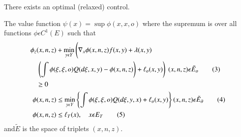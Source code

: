 \medskip
{}

\begin{thm}%
  There exists an optimal (relaxed) control.
\end{thm}

\begin{thm}%
  The value function $\psi (x)= \sup \phi (x, x, o)$ where the
  supremum is over all functions $\phi \epsilon C^1(E)$ such that 
  \begin{align*}
    \phi_z &(x, n, z)  + \min_{y \epsilon Y}
    \left(\vphantom{\int}\nabla_x \phi (x, n, z) 
    f(x, y) + \lambda(x, y)\right.\\ 
     & \left. \left(\int \phi ( \xi, \xi, o) Q (d \xi, x, y)
    - \phi (x, n, z)\right) + \ell_o (x, y) \right) ~(x, n, z) \epsilon
    \tilde{E}_o \tag{3}\label{chap2:eq3}\\
    & \geq 0\\
    \phi & (x, n, z) \leq \min_{y \epsilon Y} \left\{ \int \phi (\xi,
    \xi, o) Q (d \xi, y, x) + \ell_o (x, y)\right\} (x, n, z) \epsilon
    \tilde{E}_\partial \tag{4}\label{chap2:eq4}\\
    \phi & (x, n, z) \leq \ell_T (x), \quad x \epsilon E_T
    \tag{5}\label{chap2:eq5} 
  \end{align*}
and\pageoriginale $\tilde{E}$ is the space of triplets $(x, n, z)$.
\end{thm}

